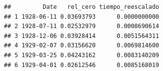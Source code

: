 \documentclass[
  oneside]{article}
\newenvironment{Shaded}{\begin{snugshade}}{\end{snugshade}}
\newcommand{\CommentTok}[1]{\textcolor[rgb]{0.56,0.35,0.01}{\textit{#1}}}
\newcommand{\FunctionTok}[1]{\textcolor[rgb]{0.13,0.29,0.53}{\textbf{#1}}}
\newcommand{\NormalTok}[1]{#1}
\newcommand{\OtherTok}[1]{\textcolor[rgb]{0.56,0.35,0.01}{#1}}
\newcommand{\SpecialCharTok}[1]{\textcolor[rgb]{0.81,0.36,0.00}{\textbf{#1}}}
\begin{document}
\begin{Shaded}
\end{Shaded}

\begin{verbatim}
##         Date   rel_cero tiempo_reescalado
## 1 1928-06-11 0.03693793      0.0000000000
## 2 1928-07-11 0.02532979      0.0008690614
## 3 1928-12-06 0.03928414      0.0051564311
## 4 1929-02-07 0.03156620      0.0069814600
## 5 1929-03-25 0.04243162      0.0083140209
## 6 1929-04-01 0.02612546      0.0085168019
\end{verbatim}
\end{document}
